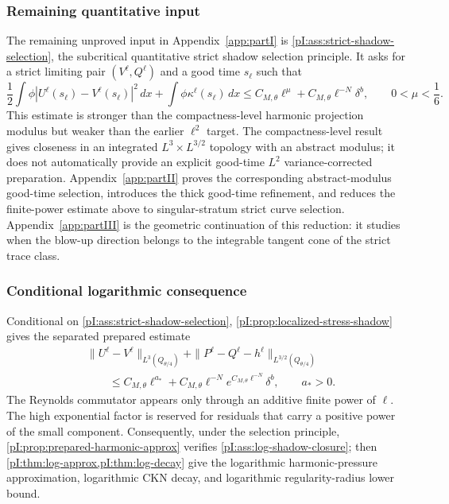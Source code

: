 \documentclass[11pt]{article}
\numberwithin{equation}{section}
\theoremstyle{plain}
\theoremstyle{definition}
\theoremstyle{remark}
\begin{document}
\subsubsection{Remaining quantitative input}

The remaining unproved input in Appendix~\ref{app:partI} is \cref{pI:ass:strict-shadow-selection}, the subcritical quantitative strict shadow selection principle.  It asks for a strict limiting pair \((V^\ell,Q^\ell)\) and a good time \(s_\ell\) such that
\[
        \frac12\int \phi |U^\ell(s_\ell)-V^\ell(s_\ell)|^2\,dx
        +\int \phi\kappa^\ell(s_\ell)\,dx
        \le C_{M,\theta}\ell^\mu+C_{M,\theta}\ell^{-N}\delta^b,
        \qquad 0<\mu<\frac16.
\]
This estimate is stronger than the compactness-level harmonic projection modulus but weaker than the earlier \(\ell^2\) target.  The compactness-level result gives closeness in an integrated \(L^3\times L^{3/2}\) topology with an abstract modulus; it does not automatically provide an explicit good-time \(L^2\) variance-corrected preparation.  Appendix~\ref{app:partII} proves the corresponding abstract-modulus good-time selection, introduces the thick good-time refinement, and reduces the finite-power estimate above to singular-stratum strict curve selection.  Appendix~\ref{app:partIII} is the geometric continuation of this reduction: it studies when the blow-up direction belongs to the integrable tangent cone of the strict trace class.

\subsubsection{Conditional logarithmic consequence}

Conditional on \cref{pI:ass:strict-shadow-selection}, \cref{pI:prop:localized-stress-shadow} gives the separated prepared estimate
\[
\begin{aligned}
&\|U^\ell-V^\ell\|_{L^3(Q_{\theta/4})}
+\|P^\ell-Q^\ell-h^\ell\|_{L^{3/2}(Q_{\theta/4})}\\
&\qquad\le
C_{M,\theta}\ell^{a_*}
+C_{M,\theta}\ell^{-N}e^{C_{M,\theta}\ell^{-N}}\delta^b,
\qquad a_*>0.
\end{aligned}
\]
The Reynolds commutator appears only through an additive finite power of \(\ell\).  The high exponential factor is reserved for residuals that carry a positive power of the small component.  Consequently, under the selection principle, \cref{pI:prop:prepared-harmonic-approx} verifies \cref{pI:ass:log-shadow-closure}; then \cref{pI:thm:log-approx,pI:thm:log-decay} give the logarithmic harmonic-pressure approximation, logarithmic CKN decay, and logarithmic regularity-radius lower bound.
\end{document}
